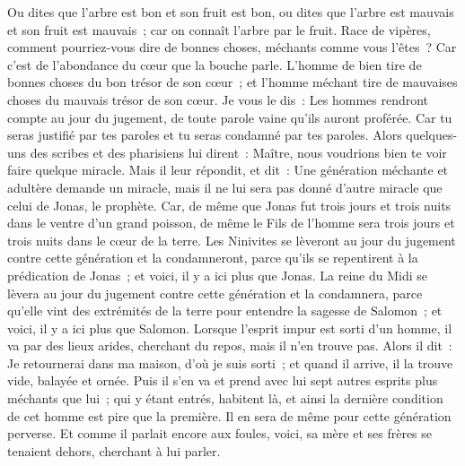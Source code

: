 \begin{multicols}{2}
Ou dites que l'arbre est bon et son fruit est bon, ou dites que l'arbre est mauvais et son fruit est mauvais~; car on connaît l'arbre par le fruit.
Race de vipères, comment pourriez-vous dire de bonnes choses, méchants comme vous l'êtes~? Car c'est de l'abondance du cœur que la bouche parle.
L'homme de bien tire de bonnes choses du bon trésor de son cœur~; et l'homme méchant tire de mauvaises choses du mauvais trésor de son cœur.
Je vous le dis~: Les hommes rendront compte au jour du jugement, de toute parole vaine qu'ils auront proférée.
Car tu seras justifié par tes paroles et tu seras condamné par tes paroles.
Alors quelques-uns des scribes et des pharisiens lui dirent~: Maître, nous voudrions bien te voir faire quelque miracle.
Mais il leur répondit, et dit~: Une génération méchante et adultère demande un miracle, mais il ne lui sera pas donné d'autre miracle que celui de Jonas, le prophète.
Car, de même que Jonas fut trois jours et trois nuits dans le ventre d'un grand poisson, de même le Fils de l'homme sera trois jours et trois nuits dans le cœur de la terre.
Les Ninivites se lèveront au jour du jugement contre cette génération et la condamneront, parce qu'ils se repentirent à la prédication de Jonas~; et voici, il y a ici plus que Jonas.
La reine du Midi se lèvera au jour du jugement contre cette génération et la condamnera, parce qu'elle vint des extrémités de la terre pour entendre la sagesse de Salomon~; et voici, il y a ici plus que Salomon.
Lorsque l'esprit impur est sorti d'un homme, il va par des lieux arides, cherchant du repos, mais il n'en trouve pas.
Alors il dit~: Je retournerai dans ma maison, d'où je suis sorti~; et quand il arrive, il la trouve vide, balayée et ornée.
Puis il s'en va et prend avec lui sept autres esprits plus méchants que lui~; qui y étant entrés, habitent là, et ainsi la dernière condition de cet homme est pire que la première. Il en sera de même pour cette génération perverse.
Et comme il parlait encore aux foules, voici, sa mère et ses frères se tenaient dehors, cherchant à lui parler.

\end{multicols}
